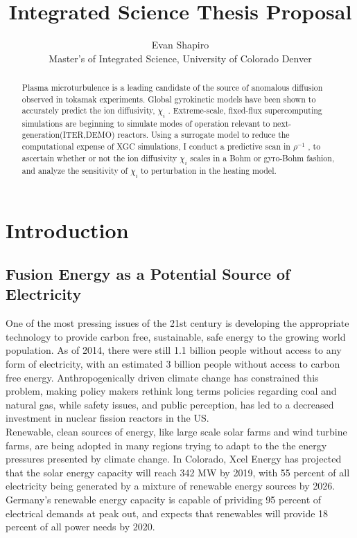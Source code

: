 \documentclass{article}
\title{Integrated Science Thesis Proposal}
\author{Evan Shapiro \\ Master's of Integrated Science, University of Colorado Denver}
\begin{document}
\begin{abstract}
Plasma microturbulence is a leading candidate of the source
of anomalous diffusion observed in %
tokamak experiments. Global gyrokinetic
models have been shown to accurately predict the ion diffusivity, $\chi_i$
. Extreme-scale, fixed-flux supercomputing simulations are beginning
to simulate modes of operation relevant to next-generation(ITER,DEMO)
reactors. Using a surrogate model to reduce the computational expense of XGC simulations, I conduct a predictive scan
in $\rho^{-1}$ , to ascertain
whether or not the ion diffusivity $\chi_i$ scales in a Bohm or gyro-Bohm
fashion, and analyze the sensitivity of $\chi_i$ to perturbation in the heating
model.%
\end{abstract}

\maketitle
\tableofcontents

\section{Introduction}
\subsection{Fusion Energy as a Potential Source of Electricity}
One of the most pressing issues of the 21st century is developing the appropriate technology to provide carbon free, sustainable, safe energy to the growing world population.  As of 2014, there were still 1.1 billion people without access to any form of electricity, with an estimated 3 billion people without access to carbon free energy. Anthropogenically driven climate change has constrained this problem, making policy makers rethink long terms policies regarding coal and natural gas, while safety issues, and public perception, has led to a decreased investment in nuclear fission reactors in the US.\\
Renewable, clean sources of energy, like large scale solar farms and wind turbine farms, are being adopted in many regions trying to adapt to the the energy pressures presented by climate change. In Colorado, Xcel Energy has projected that the solar energy capacity will reach 342 MW by 2019, with 55 percent of all electricity being generated by a mixture of renewable energy sources by 2026. Germany's renewable energy capacity is capable of prividing 95 percent of electrical demands at peak out, and expects that renewables will provide 18 percent of all power needs by 2020.\\
\end{document}
